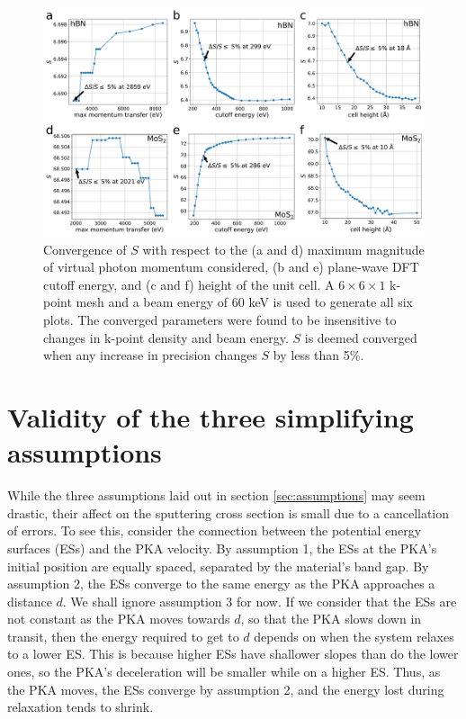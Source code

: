 \documentclass{article}
\begin{document}
\begin{figure}[H]
  \centering
  \includegraphics[width=\textwidth]{figures/convergences.pdf}
  \caption{
    Convergence of $S$ with respect to the (a and d) maximum magnitude of
    virtual photon momentum considered, (b and e) plane-wave DFT cutoff energy,
    and (c and f) height of the unit cell.
    A $6\times6\times1$ k-point mesh and a beam energy of 60 keV is used to
    generate all six plots.
    The converged parameters were found to be insensitive to changes in k-point
    density and beam energy.
    $S$ is deemed converged when any increase in precision changes $S$ by less
    than 5\%.
  }
  \label{fig:convergences}
\end{figure}
\break

\pagebreak
\section{Validity of the three simplifying assumptions}
\label{app:assumptions}

While the three assumptions laid out in section \ref{sec:assumptions} may seem
drastic, their affect on the sputtering cross section is small due to a
cancellation of errors.
To see this, consider the connection between the potential energy
surfaces (ESs) and the PKA velocity.
By assumption 1, the ESs at the PKA’s initial position are equally spaced,
separated by the material's band gap.
By assumption 2, the ESs converge to the same energy as the PKA
approaches a distance $d$.
We shall ignore assumption 3 for now.
If we consider that the ESs are not constant as the PKA moves towards $d$, so
that the PKA slows down in transit, then the energy required to get to $d$
depends on when the system relaxes to a lower ES.
This is because higher ESs have shallower slopes than do the lower ones, so
the PKA's deceleration will be smaller while on a higher ES.
Thus, as the PKA moves, the ESs converge by assumption 2, and the energy lost
during relaxation tends to shrink.
\end{document}

